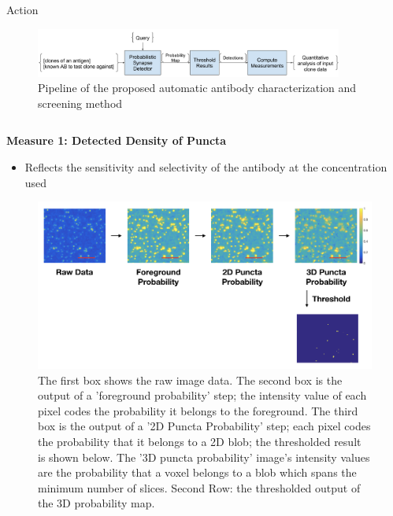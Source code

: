 \documentclass[final, table]{beamer}
\newlength{\onecolwid}
\newlength{\twocolwid}
\begin{document}
\begin{frame}[t]
\begin{columns}[t]
\begin{column}{\twocolwid}
\begin{block}{Action}
\begin{figure}
\centering
\includegraphics[width=0.9\textwidth]{figs/ABWorkflow}
\caption{Pipeline of the proposed automatic antibody characterization and screening method}
\label{fig:pipeline}
\end{figure}


\begin{columns}[t]  %

\begin{column}{\onecolwid}


\textbf{Measure 1: Detected Density of Puncta} 

\begin{itemize} 
\item Reflects the sensitivity and selectivity of the antibody at the concentration used
\end{itemize} 

\begin{figure}
\centering
\includegraphics[width=1\textwidth]{figs/3dpuncta_pipeline}
\caption{The first box shows the raw image data. The second box is the output of a 'foreground probability' step; the intensity value of each pixel codes the probability it belongs to the foreground.  The third box is the output of a '2D Puncta Probability' step; each pixel codes the probability that it belongs to a 2D blob; the thresholded result is shown below.  The '3D puncta probability' image's intensity values are the probability that a voxel belongs to a blob which spans the minimum number of slices.  Second Row: the thresholded output of the 3D probability map.} 
\end{figure}


\end{column}
\end{columns}
\end{block}
\end{column}
\end{columns}
\end{frame}
\end{document}
